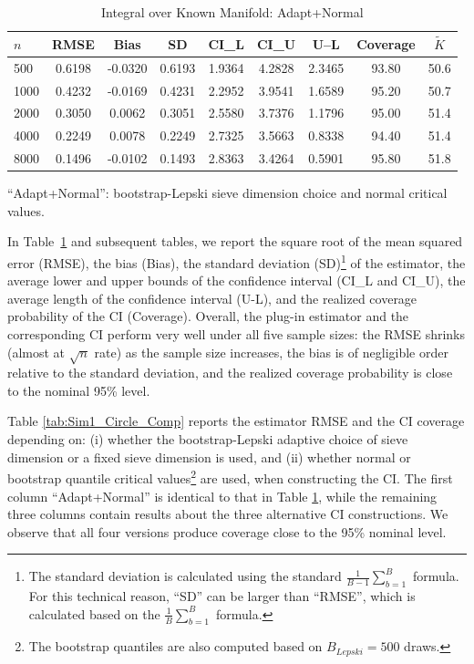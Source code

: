 \documentclass[12pt,american]{article}
\theoremstyle{definition}
\theoremstyle{plain}
\theoremstyle{definition}
\theoremstyle{plain}
\theoremstyle{plain}
\theoremstyle{plain}
\theoremstyle{plain}
\theoremstyle{plain}
\begin{document}
\begin{table}[!h]
  \centering
  \caption{Integral over Known Manifold: Adapt+Normal}
  \label{tab:Sim1_Circle}
  \begin{threeparttable}
    \begin{tabular}{lcccccccc}
      \toprule
      $n$ & RMSE & Bias & SD & CI\_L & CI\_U & U--L & Coverage & $\tilde{K}$\\
      \midrule
      500  & 0.6198 & -0.0320 & 0.6193 & 1.9364 & 4.2828 & 2.3465 & 93.80 & 50.6 \\
      1000 & 0.4232 & -0.0169 & 0.4231 & 2.2952 & 3.9541 & 1.6589 & 95.20 & 50.7 \\
      2000 & 0.3050 &  0.0062 & 0.3051 & 2.5580 & 3.7376 & 1.1796 & 95.00 & 51.4 \\
      4000 & 0.2249 &  0.0078 & 0.2249 & 2.7325 & 3.5663 & 0.8338 & 94.40 & 51.4 \\
      8000 & 0.1496 & -0.0102 & 0.1493 & 2.8363 & 3.4264 & 0.5901 & 95.80 & 51.8 \\
      \bottomrule
    \end{tabular}
    \begin{tablenotes}
      \footnotesize
    \item ``Adapt+Normal'': bootstrap-Lepski sieve dimension choice and normal critical values.
    \end{tablenotes}
  \end{threeparttable}
\end{table}

In Table~\ref{tab:Sim1_Circle} and subsequent tables, we report the square root of the mean squared error (RMSE), the bias (Bias), the standard deviation (SD)\footnote{The standard deviation is calculated using the standard $\frac{1}{B-1} \sum_{b=1}^B$ formula. For this technical reason, ``SD'' can be larger than ``RMSE'', which is calculated based on the $\frac{1}{B} \sum_{b=1}^B$ formula.} of the estimator, the average lower and upper bounds of the confidence interval (CI\_L and CI\_U), the average length of the confidence interval (U-L), and the realized coverage probability of the CI (Coverage). Overall, the plug-in estimator and the corresponding CI perform very well under all five sample sizes: the RMSE shrinks (almost at $\sqrt{n}$ rate) as the sample size increases, the bias is of negligible order relative to the standard deviation, and the realized coverage probability is close to the nominal 95\% level.

Table \ref{tab:Sim1_Circle_Comp} reports the estimator RMSE and the CI coverage depending on: (i) whether the bootstrap-Lepski adaptive choice of sieve dimension or a fixed sieve dimension is used, and (ii) whether normal or bootstrap quantile critical values\footnote{The bootstrap quantiles are also computed based on $B_{Lepski} = 500$ draws.} are used, when constructing the CI. The first column ``Adapt+Normal'' is identical to that in Table \ref{tab:Sim1_Circle}, while the remaining three columns contain results about the three alternative CI constructions. We observe that all four versions produce coverage close to the 95\% nominal level.
\end{document}
